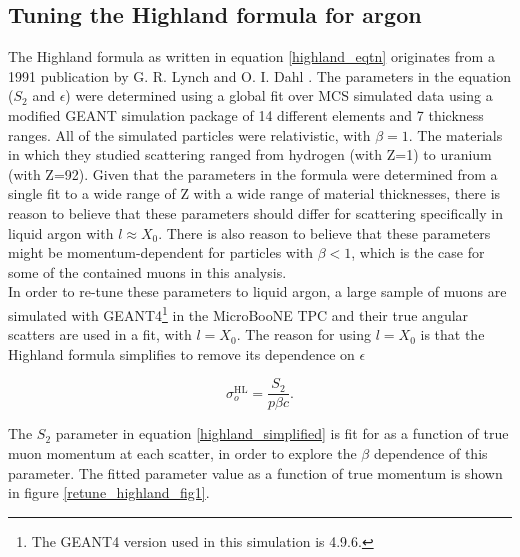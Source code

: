\documentclass[a4paper,11pt]{article}
\begin{document}
\subsection{Tuning the Highland formula for argon}\label{highland_tuning_section}

The Highland formula as written in equation \ref{highland_eqtn} originates from a 1991 publication by G. R. Lynch and O. I. Dahl \cite{highland-lynch-dahl}. The parameters in the equation ($S_2$ and $\epsilon$) were determined using a global fit over MCS simulated data using a modified GEANT simulation package of 14 different elements and 7 thickness ranges. All of the simulated particles were relativistic, with $\beta=1$. The materials in which they studied scattering ranged from hydrogen (with Z=1) to uranium (with Z=92). Given that the parameters in the formula were determined from a single fit to a wide range of Z with a wide range of material thicknesses, there is reason to believe that these parameters should differ for scattering specifically in liquid argon with $l \approx X_0$. There is also reason to believe that these parameters might be momentum-dependent for particles with $\beta < 1$, which is the case for some of the contained muons in this analysis.\\

In order to re-tune these parameters to liquid argon, a large sample of muons are simulated with GEANT4\footnote{The GEANT4 version used in this simulation is 4.9.6.} \cite{GEANT4_citation} in the MicroBooNE TPC and their true angular scatters are used in a fit, with $l = X_0$. The reason for using $l = X_0$ is that the Highland formula simplifies to remove its dependence on $\epsilon$

\begin{equation}\label{highland_simplified}
	\sigma_o^{\text{HL}}=\frac{S_2}{p\beta c}.
\end{equation}

The $S_2$ parameter in equation \ref{highland_simplified} is fit for as a function of true muon momentum at each scatter, in order to explore the $\beta$ dependence of this parameter. The fitted parameter value as a function of true momentum is shown in figure \ref{retune_highland_fig1}.


\end{document}
